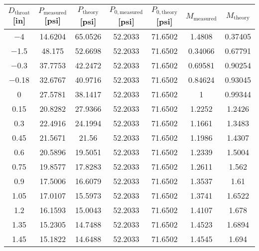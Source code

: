 \begin{tabular}{ccccccc}
\toprule
$D_\text{throat}$ [\unit{in}] & $P_\text{measured}$ [\unit{psi}] & $P_\text{theory}$ [\unit{psi}] & $P_{0,\text{measured}}$ [\unit{psi}] & $P_{0,\text{theory}}$ [\unit{psi}] & $M_\text{measured}$ & $M_\text{theory}$ \\
\midrule
\num{-4} & \num{14.6204} & \num{65.0526} & \num{52.2033} & \num{71.6502} & \num{1.4808} & \num{0.37405} \\ 
\num{-1.5} & \num{48.175} & \num{52.6698} & \num{52.2033} & \num{71.6502} & \num{0.34066} & \num{0.67791} \\ 
\num{-0.3} & \num{37.7753} & \num{42.2472} & \num{52.2033} & \num{71.6502} & \num{0.69581} & \num{0.90254} \\ 
\num{-0.18} & \num{32.6767} & \num{40.9716} & \num{52.2033} & \num{71.6502} & \num{0.84624} & \num{0.93045} \\ 
\num{0} & \num{27.5781} & \num{38.1417} & \num{52.2033} & \num{71.6502} & \num{1} & \num{0.99344} \\ 
\num{0.15} & \num{20.8282} & \num{27.9366} & \num{52.2033} & \num{71.6502} & \num{1.2252} & \num{1.2426} \\ 
\num{0.3} & \num{22.4916} & \num{24.1994} & \num{52.2033} & \num{71.6502} & \num{1.1661} & \num{1.3483} \\ 
\num{0.45} & \num{21.5671} & \num{21.56} & \num{52.2033} & \num{71.6502} & \num{1.1986} & \num{1.4307} \\ 
\num{0.6} & \num{20.5896} & \num{19.5051} & \num{52.2033} & \num{71.6502} & \num{1.2339} & \num{1.5004} \\ 
\num{0.75} & \num{19.8577} & \num{17.8283} & \num{52.2033} & \num{71.6502} & \num{1.2611} & \num{1.562} \\ 
\num{0.9} & \num{17.5006} & \num{16.6079} & \num{52.2033} & \num{71.6502} & \num{1.3537} & \num{1.61} \\ 
\num{1.05} & \num{17.0107} & \num{15.5973} & \num{52.2033} & \num{71.6502} & \num{1.3741} & \num{1.6522} \\ 
\num{1.2} & \num{16.1593} & \num{15.0043} & \num{52.2033} & \num{71.6502} & \num{1.4107} & \num{1.678} \\ 
\num{1.35} & \num{15.2305} & \num{14.7488} & \num{52.2033} & \num{71.6502} & \num{1.4523} & \num{1.6894} \\ 
\num{1.45} & \num{15.1822} & \num{14.6488} & \num{52.2033} & \num{71.6502} & \num{1.4545} & \num{1.694} \\ 
\bottomrule
\end{tabular}